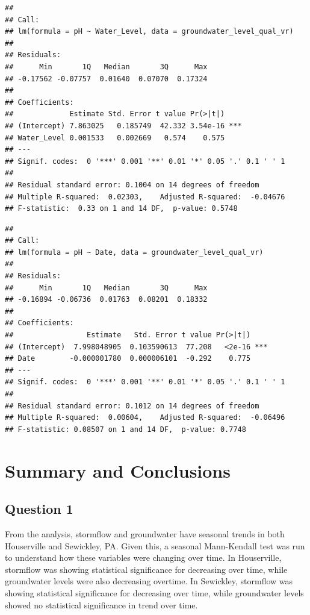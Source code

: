 \documentclass[
  12pt,
]{article}
\begin{document}
\newpage

\begin{verbatim}
## 
## Call:
## lm(formula = pH ~ Water_Level, data = groundwater_level_qual_vr)
## 
## Residuals:
##      Min       1Q   Median       3Q      Max 
## -0.17562 -0.07757  0.01640  0.07070  0.17324 
## 
## Coefficients:
##             Estimate Std. Error t value Pr(>|t|)    
## (Intercept) 7.863025   0.185749  42.332 3.54e-16 ***
## Water_Level 0.001533   0.002669   0.574    0.575    
## ---
## Signif. codes:  0 '***' 0.001 '**' 0.01 '*' 0.05 '.' 0.1 ' ' 1
## 
## Residual standard error: 0.1004 on 14 degrees of freedom
## Multiple R-squared:  0.02303,    Adjusted R-squared:  -0.04676 
## F-statistic:  0.33 on 1 and 14 DF,  p-value: 0.5748
\end{verbatim}

\begin{verbatim}
## 
## Call:
## lm(formula = pH ~ Date, data = groundwater_level_qual_vr)
## 
## Residuals:
##      Min       1Q   Median       3Q      Max 
## -0.16894 -0.06736  0.01763  0.08201  0.18332 
## 
## Coefficients:
##                 Estimate   Std. Error t value Pr(>|t|)    
## (Intercept)  7.998048905  0.103590613  77.208   <2e-16 ***
## Date        -0.000001780  0.000006101  -0.292    0.775    
## ---
## Signif. codes:  0 '***' 0.001 '**' 0.01 '*' 0.05 '.' 0.1 ' ' 1
## 
## Residual standard error: 0.1012 on 14 degrees of freedom
## Multiple R-squared:  0.00604,    Adjusted R-squared:  -0.06496 
## F-statistic: 0.08507 on 1 and 14 DF,  p-value: 0.7748
\end{verbatim}

\newpage

\hypertarget{summary-and-conclusions}{%
\section{Summary and Conclusions}\label{summary-and-conclusions}}

\hypertarget{question-1}{%
\subsection{Question 1}\label{question-1}}

From the analysis, stormflow and groundwater have seasonal trends in
both Houserville and Sewickley, PA. Given this, a seasonal Mann-Kendall
test was run to understand how these variables were changing over time.
In Houserville, stormflow was showing statistical significance for
decreasing over time, while groundwater levels were also decreasing
overtime. In Sewickley, stormflow was showing statistical significance
for decreasing over time, while groundwater levels showed no statistical
significance in trend over time.
\end{document}
